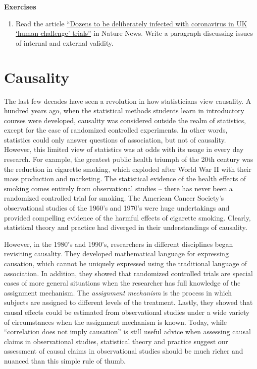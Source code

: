 \documentclass[
]{book}
\providecommand{\tightlist}{%
  \setlength{\itemsep}{0pt}\setlength{\parskip}{0pt}}
\begin{document}
\textbf{Exercises}

\begin{enumerate}
\def\labelenumi{\arabic{enumi}.}
\tightlist
\item
  Read the article \href{https://www.nature.com/articles/d41586-020-02821-4}{``Dozens to be deliberately infected with coronavirus in UK `human challenge' trials''} in Nature News. Write a paragraph discussing issues of internal and external validity.
\end{enumerate}

\hypertarget{causality}{%
\chapter{Causality}\label{causality}}

The last few decades have seen a revolution in how statisticians view causality. A hundred years ago, when the statistical methods students learn in introductory courses were developed, causality was considered outside the realm of statistics, except for the case of randomized controlled experiments. In other words, statistics could only answer questions of association, but not of causality. However, this limited view of statistics was at odds with its usage in every day research. For example, the greatest public health triumph of the 20th century was the reduction in cigarette smoking, which exploded after World War II with their mass production and marketing. The statistical evidence of the health effects of smoking comes entirely from observational studies -- there has never been a randomized controlled trial for smoking. The American Cancer Society's observational studies of the 1960's and 1970's were huge undertakings and provided compelling evidence of the harmful effects of cigarette smoking. Clearly, statistical theory and practice had diverged in their understandings of causality.

However, in the 1980's and 1990's, researchers in different disciplines began revisiting causality. They developed mathematical language for expressing causation, which cannot be uniquely expressed using the traditional language of association. In addition, they showed that randomized controlled trials are special cases of more general situations when the researcher has full knowledge of the assignment mechanism. The \emph{assignment mechanism} is the process in which subjects are assigned to different levels of the treatment. Lastly, they showed that causal effects could be estimated from observational studies under a wide variety of circumstances when the assignment mechanism is known. Today, while ``correlation does not imply causation'' is still useful advice when assessing causal claims in observational studies, statistical theory and practice suggest our assessment of causal claims in observational studies should be much richer and nuanced than this simple rule of thumb.
\end{document}
